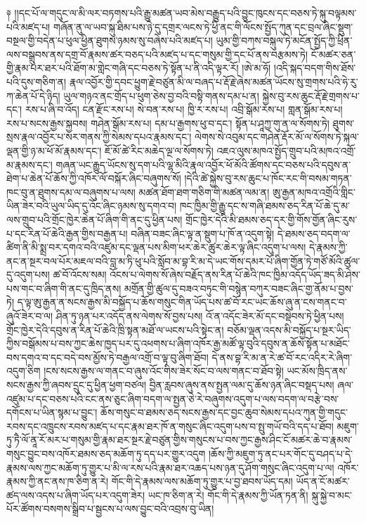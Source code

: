 \documentclass{article}
\begin{document}
༈ །།དང་པོ་ལ་གདུང་ལ་མི་ལར་བཏགས་པའི་རྒྱུ་མཚན་ཡབ་མེས་བརྒྱུད་པའི་བྱུང་ཁུངས་དང་བཅས་ཏེ་སྐུ་བལྟམས་པའི་མཛད་པ། གཞོན་ནུ་ལ་ཡབ་སྐུ་ཐིམ་པས་ཉེ་དུ་དགྲར་ལངས་ཏེ་ཕྱི་ནང་གི་ལོངས་སྤྱོད་ཀུན་དང་བྲལ་ཞིང་སྡུག་བསྔལ་གྱི་བདེན་པ་ཕུལ་ཕྱིན་ཐུགས་ཉམས་སུ་བཞེས་པའི་མཛད་པ། ཡུམ་གྱི་བཀས་བསྐུལ་ཏེ་མངོན་སྤྱོད་ཀྱི་ཕྲིན་ལས་བསྒྲུབས་ནས་དགྲ་བོ་རྣམས་ཚར་བཅད་པའི་མཛད་པ་དང་གསུམ་གྱི་དང་པོ་ནས་བརྩམས་ཏེ། ངོ་མཚར་ཅན་གྱི་རྣམ་པར་ཐར་པའི་ཐོག་མ་གླེང་གཞི་དང་བཅས་ཏེ་སྟོན་པ་ནི་འདི་ལྟར་རོ། །ཨེ་མ་ཧོ། །འདི་སྐད་བདག་གིས་ཐོས་པའི་དུས་གཅིག་ན། རྣལ་འབྱོར་གྱི་དབང་ཕྱུག་རྗེ་བཙུན་མི་ལ་བཞད་པ་རྡོ་རྗེ་ཞེས་མཚན་ཡོངས་སུ་གྲགས་པའི་ཧེ་རུ་ཀ་ཆེན་པོ་དེ་ཉིད། ཡུལ་གཉའ་ནང་གྲོད་པ་ཕུག་ཅེས་བྱ་བའི་བསྟི་གནས་དམ་པ་ན། སྐྱེས་བུ་རས་ཆུང་རྡོ་རྗེ་གྲགས་པ་དང་། རས་པ་ཞི་བ་འོད། ངན་རྫོང་རས་པ། སེ་བན་རས་པ། ཁྱི་ར་རས་པ། འབྲི་སྒོམ་རས་པ། གླན་སྒོམ་རས་པ། རས་པ་སངས་རྒྱས་སྐྱབས། གཤེན་སྒོམ་རས་པ། དམ་པ་རྒྱགས་ཕུ་བ་དང་། སྟོན་པ་ཤཱཀྱ་གུ་ན་ལ་སོགས་ཏེ། ཐུགས་སྲས་རྣལ་འབྱོར་པ་སར་གནས་ཀྱི་སེམས་དཔའ་རྣམས་དང་། ལེགས་སེ་འབུམ་དང་གཤེན་རྡོར་མོ་ལ་སོགས་ཏེ་སྐལ་ལྡན་གྱི་ཉ་མ་ཕོ་མོ་རྣམས་དང་། ཇོ་མོ་ཚེ་རིང་མཆེད་ལྔ་ལ་སོགས་ཏེ། འཇའ་ལུས་མཁའ་སྤྱོད་གྲུབ་པའི་མཁའ་འགྲོ་མ་རྣམས་དང་། གཞན་ཡང་རྒྱུད་ཡོངས་སུ་དག་པའི་ལྷ་མིའི་རྣལ་འབྱོར་ཕོ་མོའི་ཚོགས་དང་བཅས་པའི་དབུས་ན་ཐེག་པ་ཆེན་པོ་ཆོས་ཀྱི་འཁོར་ལོ་བསྐོར་ཞིང་བཞུགས་སོ། །དེའི་ཚེ་སྐྱེས་བུ་རས་ཆུང་པ་ཁོང་རང་གི་བསམ་གཏན་ཁང་བུ་ན་ཐུགས་དམ་ལ་བཞུགས་པ་ལས། མཚན་ཐོག་ཐག་གཅིག་གི་མཚན་ལམ་ན། ཨུ་རྒྱན་མཁའ་འགྲོའི་གླིང་ཡིན་ཟེར་བའི་ཡུལ་ཡིད་དུ་འོང་ཞིང་ཉམས་སུ་དགའ་བ། ཁང་ཁྱིམ་གྱི་རྒྱུ་དང་ས་གཞི་ཐམས་ཅད་རིན་པོ་ཆེ་དུ་མ་ལས་གྲུབ་པའི་གྲོང་ཁྱེར་ཆེན་པོ་ཞིག་གི་ནང་དུ་ཕྱིན་པས། གྲོང་ཁྱེར་དེའི་མི་ཐམས་ཅད་དར་གྱི་གོས་གྱོན་ཞིང་རུས་པ་དང་རིན་པོ་ཆེའི་རྒྱན་གྱིས་བརྒྱན་པ། བཞིན་བཟང་ཞིང་ལྟ་ན་སྡུག་པ་ཁོ་ན་འདུག་སྟེ། དེ་ཐམས་ཅད་བདག་ལ་ཚིག་ནི་མི་སྨྲ་བར་དགའ་བའི་འཛུམ་དང་ལྡན་པས་མིག་ཕར་ཆེར་ཚུར་ཆེར་ལྟ་ཞིང་འདུག་པ་ལས། དེ་རྣམས་ཀྱི་ནང་ན་སྔར་བལ་པོར་མཇལ་བའི་བླ་མ་ཏི་ཕུ་པའི་སློབ་མ་བྷ་རི་མ་དེ་ཡང་གོས་དམར་པོ་ཞིག་གྱོན་ཏེ་གཙོ་མོའི་ཚུལ་དུ་འདུག་པས། ཚ་བོ་འོངས་སམ། འོངས་པ་ལེགས་སོ་ཞེས་བརྗོད་ནས་རིན་པོ་ཆེའི་ཁང་ཁྱིམ་འདོད་ཡོད་ཟད་མི་ཤེས་པས་གང་བ་ཞིག་གི་ནང་དུ་ཁྲིད་ནས། མགྲོན་གྱི་ཚུལ་དུ་བཟའ་བཏུང་གི་བསྙེན་བཀུར་བཟང་ཞིང་གྱ་ནོམ་པ་བྱས་ཏེ། ད་ལྟ་ཨུ་རྒྱན་ན་སངས་རྒྱས་མི་བསྐྱོད་པ་ཆོས་གསུང་གིན་ཡོད་པས་ཚ་བོ་རང་ཡང་ཆོས་ཞུ་ན་ངས་གནང་བ་ཞུའོ་ཟེར་བ་ལ། ཤིན་ཏུ་ཉན་པར་འདོད་ནས་ལེགས་སོ་བྱས་པས། འོ་ན་འདོང་ཟེར་མོ་དང་བསྡེབས་ཏེ་ཕྱིན་པས། གྲོང་ཁྱེར་དེའི་དབུས་ན་རིན་པོ་ཆེའི་ཁྲི་སྟན་མཐོ་ལ་ཡངས་པའི་སྟེང་ན། བཅོམ་ལྡན་འདས་མི་བསྐྱོད་པ་སྔར་ཡིད་ཀྱིས་བསྒོམས་པ་བས་ཀྱང་ཆེས་ཁྱད་པར་དུ་འཕགས་པ་ཞིག་འཁོར་རྒྱ་མཚོ་ལྟ་བུའི་དབུས་ན་ཆོས་སྟོན་པ་མཐོང་བས་དགའ་བ་དང་བདེ་བས་མྱོས་ཏེ་བརྒྱལ་འགྲོ་བ་ལྟ་བུ་ཞིག་ཐོབ། དེ་ནས་བྷ་རི་མ་ན་རེ་ཚ་བོ་རང་འདིར་རེ་ཞིག་འདུག་ཅིག །ངས་སངས་རྒྱས་ལ་གནང་བ་ཞུས་འོང་གིས་ཟེར་སོང་བ་ལས་གནང་བ་ཐོབ་སྟེ། ཡང་མོས་ཁྲིད་ནས་སངས་རྒྱས་ཀྱི་ཞབས་དྲུང་དུ་ཕྱིན་ཕྱག་བཙལ། བྱིན་རླབས་ཞུས་ནས་སྤྱན་ལམ་དུ་ཆོས་ཉན་ཞིང་བསྡད་པས། ཞལ་འཛུམ་པ་དང་བཅས་པའི་ངང་ནས་ཅུང་ཞིག་བདག་ལ་སྤྱན་ཅེ་རེ་བཞུགས་འདུག་པ་ལས་བདག་ལ་བརྩེ་བས་དགོངས་པ་ཡིན་སྙམ་པ་བྱུང་། ཆོས་གསུང་བ་ཐམས་ཅད་སངས་རྒྱས་དང་བྱང་ཆུབ་སེམས་དཔའ་ཀུན་གྱི་གདུང་རབས་དང་འཁྲུངས་རབས་མཛད་པ་དང་རྣམ་ཐར་ཁོ་ན་གསུང་ཞིང་འདུག་པས་བ་སྤུ་གཡོ་བའི་དད་པ་ཐོབ། མཇུག་ཏུ་ཏཻ་ལོ་ནཱ་རོ་མར་པ་གསུམ་གྱི་རྣམ་ཐར་སྔར་རྗེ་བཙུན་གྱིས་གསུངས་པ་བས་ཀྱང་རྒྱས་ཤིང་ངོ་མཚར་ཆེ་བ་རྣམས་གསུང་བྱུང་བས་འཁོར་ཐམས་ཅད་མཆོག་ཏུ་དད་པར་གྱུར་འདུག །ཆོས་ཀྱི་མཇུག་ཏུ་ནང་པར་གོང་དུ་བཤད་པ་དེ་རྣམས་ལས་ཀྱང་མཆོག་ཏུ་གྱུར་པ་མི་ལ་རས་པའི་རྣམ་ཐར་འཆད་པས་ཉན་དུ་ཤོག་གསུང་ཞིང་འདུག་པ་ལ། འཁོར་རྣམས་ཀྱི་ནང་ནས་ཁ་ཅིག་ན་རེ། གོང་གི་དེ་རྣམས་ལས་མཆོག་ཏུ་གྱུར་པ་བྱ་ཐབས་ཡོད་དམ། ཡོད་ན་ངོ་མཚར་ཚད་ལས་འདས་པ་ཞིག་ཡོད་པར་འདུག་ཟེར། ཡང་ཁ་ཅིག་ན་རེ། གོང་གི་དེ་རྣམས་ཀྱི་ཡོན་ཏན་ནི། སྐུ་སྐྱེ་བ་མང་པོར་ཚོགས་བསགས་སྒྲིབ་པ་སྦྱངས་པ་ལས་བྱུང་བའི་འབྲས་བུ་ཡིན། 
\end{document}
